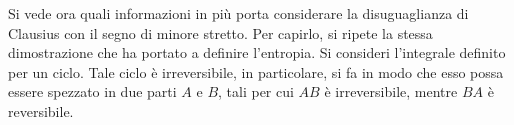 \documentclass[10pt,a4paper]{book}
\begin{document}
Si vede ora quali informazioni in più porta considerare la disuguaglianza di Clausius con il segno di minore stretto.  Per capirlo, si ripete la stessa dimostrazione che ha portato a definire l'entropia. Si consideri l'integrale definito per un ciclo. Tale ciclo è irreversibile, in particolare, si fa in modo che esso possa essere spezzato in due parti $A$ e $B$, tali per cui $AB$ è irreversibile, mentre $BA$ è reversibile.
\begin{figure}[htpb]
	\centering
	


	\begin{tikzpicture}[x=0.75pt,y=0.75pt,yscale=-1,xscale=1]


\end{tikzpicture}
\end{figure}
\end{document}
